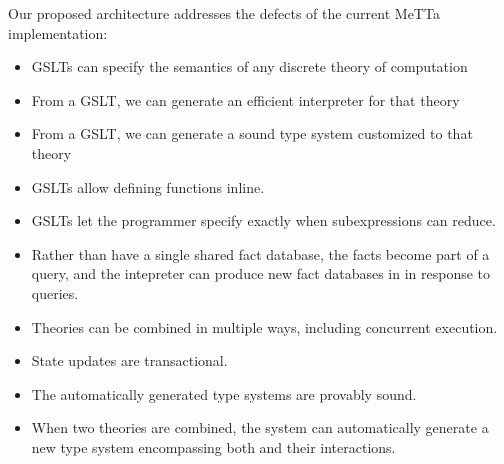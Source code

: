 \documentclass{article}
\begin{document}
Our proposed architecture addresses the defects of the current MeTTa implementation:

\begin{itemize}
    \item GSLTs can specify the semantics of any discrete theory of computation
    \item From a GSLT, we can generate an efficient interpreter for that theory
    \item From a GSLT, we can generate a sound type system customized to that theory
    \item GSLTs allow defining functions inline.
    \item GSLTs let the programmer specify exactly when subexpressions can reduce.
    \item Rather than have a single shared fact database, the facts become part of a query, and the intepreter can produce new fact databases in in response to queries.
    \item Theories can be combined in multiple ways, including concurrent execution.
    \item State updates are transactional.
    \item The automatically generated type systems are provably sound.
    \item When two theories are combined, the system can automatically generate a new type system encompassing both and their interactions.
\end{itemize}
\end{document}
